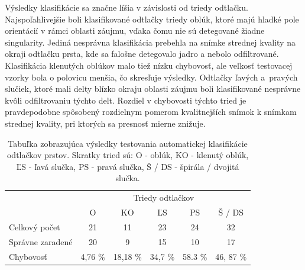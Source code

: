   Výsledky klasifikácie sa značne líšia v závislosti od triedy odtlačku. Najspoľahlivejšie boli klasifikované odtlačky triedy oblúk, ktoré majú hladké
  pole orientácií v rámci oblasti záujmu, vďaka čomu nie sú detegované žiadne singularity. Jediná nesprávna klasifikácia prebehla na snímke strednej kvality
  na okraji odtlačku prsta, kde sa falošne detegovalo jadro a nebolo odfiltrované. Klasifikácia klenutých oblúkov malo tiež nízku chybovosť, ale veľkosť
  testovacej vzorky bola o polovicu menšia, čo skresľuje výsledky.
  Odtlačky ľavých a~pravých slučiek, ktoré mali delty blízko okraju oblasti záujmu boli klasifikované nesprávne kvôli odfiltrovaniu týchto delt. Rozdiel v
  chybovosti týchto tried je pravdepodobne spôsobený rozdielnym pomerom kvalitnejších snímok k snímkam strednej kvality, pri ktorých sa presnosť mierne
  znižuje.

  \begin{table}[ht]
    \centering
    \caption{Tabuľka zobrazujúca výsledky testovania automatickej klasifikácie odtlačkov prstov. Skratky tried sú: O - oblúk, KO - klenutý oblúk,
    ĽS - ľavá slučka, PS - pravá slučka, Š / DS - špirála / dvojitá slučka.}
    \begin{tabular}{ l | c | c | c | c | c | }
      \cline{2-6}
                                              & \multicolumn{5}{|c|}{Triedy odtlačkov}            \\
      \cline{2-6}
                                              & O       & KO        & ĽS     & PS    & Š / DS     \\
      \hline
      \multicolumn{1}{|l|}{Celkový počet}     & 21      & 11        & 23      & 24    & 32        \\
      \multicolumn{1}{|l|}{Správne zaradené}  & 20      & 9         & 15      & 10    & 17        \\
      \multicolumn{1}{|l|}{Chybovosť}         & 4,76 \% & 18,18 \%  & 34,7 \% & 58.3 \% & 46, 87 \% \\
      \hline
    \end{tabular}
    \label{tab:vysledky_testov}
  \end{table}


